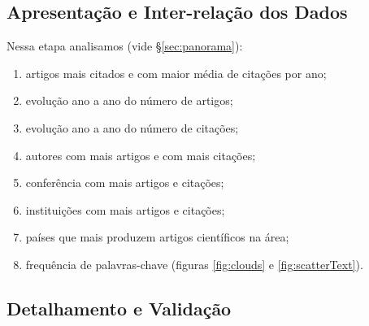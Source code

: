 \documentclass[sigconf]{acmart}
\begin{document}
\subsection{Apresentação e Inter-relação dos Dados}\label{inter}
Nessa etapa analisamos (vide \S\ref{sec:panorama}):
\begin{enumerate}
  \item artigos mais citados e com maior média de citações por ano;
  \item evolução ano a ano do número de artigos;
  \item evolução ano a ano do número de citações;
  \item autores com mais artigos e com mais citações;
  \item conferência com mais artigos e citações;
  \item instituições com mais artigos e citações;
  \item países que mais produzem artigos científicos na área;
  \item frequência de palavras-chave (figuras \ref{fig:clouds} e \ref{fig:scatterText}).
\end{enumerate}
\subsection{Detalhamento e Validação}\label{detalha}
\end{document}
